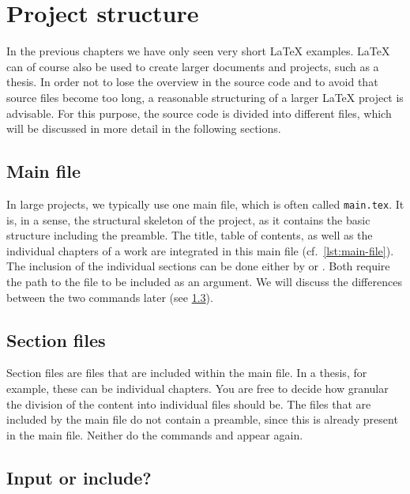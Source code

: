 \chapter{Project structure}
\label{sec:project-structure}

In the previous chapters we have only seen very short \LaTeX{} examples. \LaTeX{} can of course also be used to create larger documents and projects, such as a thesis. 
In order not to lose the overview in the source code and to avoid that source files become too long, a reasonable structuring of a larger \LaTeX{} project is advisable. For this purpose, the source code is divided into different files, which will be discussed in more detail in the following sections.

\section{Main file}

In large projects, we typically use one main file, which is often called \texttt{main.tex}. It is, in a sense, the structural skeleton of the project, as it contains the basic structure including the preamble. The title, table of contents, as well as the individual chapters of a work are integrated in this main file (cf.\ \cref{lst:main-file}). The inclusion of the individual sections can be done either by \texttt{} or \texttt{}. Both require the path to the file to be included as an argument. We will discuss the differences between the two commands later (see \cref{sec:input-vs-include}).


\section{Section files}
Section files are files that are included within the main file. In a thesis, for example, these can be individual chapters. You are free to decide how granular the division of the content into individual files should be.
The files that are included by the main file do not contain a preamble, since this is already present in the main file. Neither do the commands \texttt{} and \texttt{} appear again.

\section{Input or include?}
\label{sec:input-vs-include}

